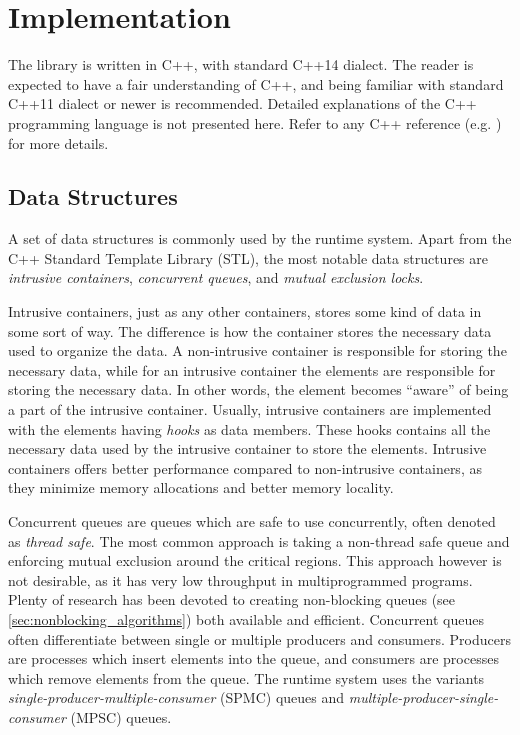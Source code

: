 

\chapter{Implementation}
\label{ch:implementation}


The library is written in C++, with standard C++14 dialect. The reader is expected to have a fair understanding of C++, and being familiar with standard C++11 dialect or newer is recommended. Detailed explanations of the C++ programming language is not presented here. Refer to any C++ reference (e.g. \citet{stroustrup2013c++}) for more details.


\FloatBarrier
\section{Data Structures}


A set of data structures is commonly used by the runtime system. Apart from the C++ Standard Template Library (STL), the most notable data structures are \textit{intrusive containers}, \textit{concurrent queues}, and \textit{mutual exclusion locks}.

Intrusive containers, just as any other containers, stores some kind of data in some sort of way. The difference is how the container stores the necessary data used to organize the data. A non\hyp{}intrusive container is responsible for storing the necessary data, while for an intrusive container the elements are responsible for storing the necessary data. In other words, the element becomes ``aware'' of being a part of the intrusive container. Usually, intrusive containers are implemented with the elements having \textit{hooks} as data members. These hooks contains all the necessary data used by the intrusive container to store the elements. Intrusive containers offers better performance compared to non\hyp{}intrusive containers, as they minimize memory allocations and better memory locality.

Concurrent queues are queues which are safe to use concurrently, often denoted as \textit{thread safe}. The most common approach is taking a non\hyp{}thread safe queue and enforcing mutual exclusion around the critical regions. This approach however is not desirable, as it has very low throughput in multiprogrammed programs. Plenty of research \citep[e.g.][]{chase2005dynamic,le2013correct} has been devoted to creating non\hyp{}blocking queues (see \cref{sec:nonblocking_algorithms}) both available and efficient. Concurrent queues often differentiate between single or multiple producers and consumers. Producers are processes which insert elements into the queue, and consumers are processes which remove elements from the queue. The runtime system uses the variants \textit{single\hyp{}producer\hyp{}multiple\hyp{}consumer} (SPMC) queues and \textit{multiple\hyp{}producer\hyp{}single\hyp{}consumer} (MPSC) queues.

